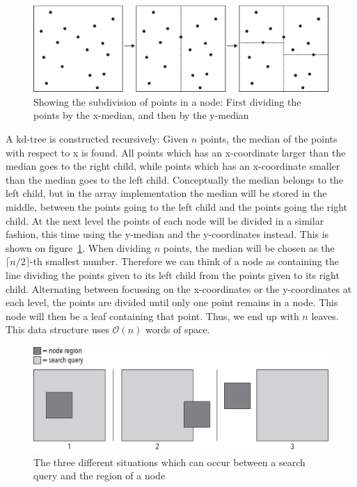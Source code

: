 \begin{figure}[h]
    \centering
    \includegraphics[width = 1.0\textwidth]{pictures/kd_subdivision.eps}
    \caption{Showing the subdivision of points in a node: First dividing the points by the x-median, and then by the y-median}\label{fig:kdsubdivision}
\end{figure}


A kd-tree is constructed recursively: Given $n$ points, the median of the points with respect to x is found. All points which has an x-coordinate larger than the median goes to the right child, while points which has an x-coordinate smaller than the median goes to the left child. Conceptually the median belongs to the left child, but in the array implementation the median will be stored in the middle, between the points going to the left child and the points going the right child. At the next level the points of each node will be divided in a similar fashion, this time using the y-median and the y-coordinates instead. This is shown on figure~\ref{fig:kdsubdivision}. When dividing $n$ points, the median will be chosen as the $\lceil n/2 \rceil$-th smallest number. Therefore we can think of a node as containing the line dividing the points given to its left child from the points given to its right child.
Alternating between focussing on the x-coordinates or the y-coordinates at each level, the points are divided until only one point remains in a node. This node will then be a leaf containing that point. Thus, we end up with $n$ leaves. This data structure uses $\mathcal{O}(n)$ words of space. \\

\begin{figure}[h]
    \centering
    \includegraphics[width = 1.0\textwidth]{pictures/search_query_overlap.png}
    \caption{The three different situations which can occur between a search query and the region of a node}\label{fig:kdsearchoverlap}
\end{figure}

